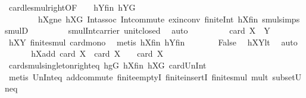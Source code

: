 \begin{isabellebody}
\ card{\isacharunderscore}{\kern0pt}le{\isacharunderscore}{\kern0pt}smul{\isacharunderscore}{\kern0pt}right{\isacharbrackleft}{\kern0pt}OF\ {\isacharunderscore}{\kern0pt}\ {\isacharunderscore}{\kern0pt}\ {\isacharunderscore}{\kern0pt}\ hY{}fin\ hY{}G{\isacharbrackright}{\kern0pt}\ \isanewline
\ \ \ \ \ \ \ \ hXgne\ hXG\ Int{\isacharunderscore}{\kern0pt}assoc\ Int{\isacharunderscore}{\kern0pt}commute\ ex{\isacharunderscore}{\kern0pt}in{\isacharunderscore}{\kern0pt}conv\ finite{\isacharunderscore}{\kern0pt}Int\ hXfin\ smul{\isachardot}{\kern0pt}simps\ smul{\isacharunderscore}{\kern0pt}D{\isacharparenleft}{\kern0pt}{}{\isacharparenright}{\kern0pt}\ \isanewline
\ \ \ \ \ \ \ \ smul{\isacharunderscore}{\kern0pt}Int{\isacharunderscore}{\kern0pt}carrier\ unit{\isacharunderscore}{\kern0pt}closed\ \isamarkupfalse%
\ auto\isanewline
\ \ \ \ \isamarkupfalse%
\ \isamarkupfalse%
\ {\isachardoublequoteopen}{\isachardot}{\kern0pt}{\isachardot}{\kern0pt}{\isachardot}{\kern0pt}\ {\isasymle}\ card\ {\isacharparenleft}{\kern0pt}X\ {\isasymcdots}\ Y{\isacharparenright}{\kern0pt}{\isachardoublequoteclose}\ \isamarkupfalse%
\ hXY{}\ finite{\isacharunderscore}{\kern0pt}smul\ card{\isacharunderscore}{\kern0pt}mono\ \isamarkupfalse%
\ {\isacharparenleft}{\kern0pt}metis\ hXfin\ hYfin{\isacharparenright}{\kern0pt}\isanewline
\ \ \ \ \isamarkupfalse%
\ \isamarkupfalse%
\ False\ \isamarkupfalse%
\ hXYlt\ \isamarkupfalse%
\ auto\isanewline
\ \ \isamarkupfalse%
\isanewline
\ \ \isamarkupfalse%
\ hXadd{\isacharcolon}{\kern0pt}\ {\isachardoublequoteopen}card\ {\isacharquery}{\kern0pt}X{}\ {\isacharplus}{\kern0pt}\ card\ {\isacharquery}{\kern0pt}X{}\ {\isacharequal}{\kern0pt}\ {}\ {\isacharasterisk}{\kern0pt}\ card\ X{\isachardoublequoteclose}\ \isanewline
\ \ \ \ \isamarkupfalse%
\ card{\isacharunderscore}{\kern0pt}smul{\isacharunderscore}{\kern0pt}singleton{\isacharunderscore}{\kern0pt}right{\isacharunderscore}{\kern0pt}eq\ hgG\ hXfin\ hXG\ card{\isacharunderscore}{\kern0pt}Un{\isacharunderscore}{\kern0pt}Int\isanewline
\ \ \ \ \isamarkupfalse%
\ {\isacharparenleft}{\kern0pt}metis\ Un{\isacharunderscore}{\kern0pt}Int{\isacharunderscore}{\kern0pt}eq{\isacharparenleft}{\kern0pt}{}{\isacharparenright}{\kern0pt}\ add{\isachardot}{\kern0pt}commute\ finite{\isachardot}{\kern0pt}emptyI\ finite{\isachardot}{\kern0pt}insertI\ finite{\isacharunderscore}{\kern0pt}smul\ mult{\isacharunderscore}{\kern0pt}{}\ subset{\isacharunderscore}{\kern0pt}Un{\isacharunderscore}{\kern0pt}eq{\isacharparenright}{\kern0pt}\isanewline

\end{isabellebody}
